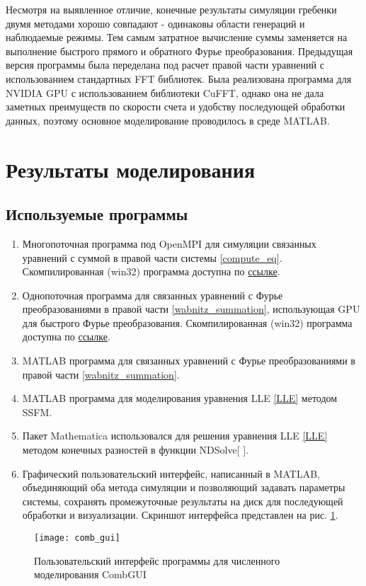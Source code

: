Несмотря на выявленное отличие, конечные результаты симуляции гребенки двумя методами хорошо совпадают - одинаковы области генераций и наблюдаемые режимы. Тем самым затратное вычисление суммы заменяется на выполнение быстрого прямого и обратного Фурье преобразования. Предыдущая версия программы была переделана под расчет правой части уравнений с использованием стандартных FFT библиотек. Была реализована программа для NVIDIA GPU с использованием библиотеки CuFFT, однако она не дала заметных преимуществ по скорости счета и удобству последующей обработки данных, поэтому основное моделирование проводилось в среде MATLAB.

\section{Результаты моделирования}
\subsection{Используемые программы}
\begin{enumerate}
\item
Многопоточная программа под OpenMPI для симуляции связанных уравнений с суммой в правой части системы \eqref{compute_eq}. Скомпилированная (win32) программа доступна по \href{https://www.dropbox.com/sh/940djjdx3ojcsxy/_1JZsWTqPN/mpi}{ссылке}.
\item
Однопоточная программа для связанных уравнений с Фурье преобразованиями в правой части \eqref{wabnitz_summation}, использующая GPU для быстрого Фурье преобразования. Скомпилированная (win32) программа доступна по \href{https://www.dropbox.com/sh/940djjdx3ojcsxy/n4hBUtto1o/gpu}{ссылке}.
\item
MATLAB программа для связанных уравнений с Фурье преобразованиями в правой части \eqref{wabnitz_summation}.
\item
MATLAB программа для моделирования уравнения LLE \eqref{LLE} методом SSFM.
\item
Пакет Mathematica использовался для решения уравнения LLE \eqref{LLE} методом конечных разностей в функции NDSolve[ ].
\item Графический пользовательский интерфейс, написанный в MATLAB, объединяющий оба метода симуляции и позволяющий задавать параметры системы, сохранять промежуточные результаты на диск для последующей обработки и визуализации. Скриншот интерфейса представлен на рис. \ref{comb_gui}.
\end{enumerate}
\begin{figure}
 \centering
 \texttt{[image: comb\_gui]}
 \caption{Пользовательский интерфейс программы для численного моделирования CombGUI} \label{comb_gui}
\end{figure}

